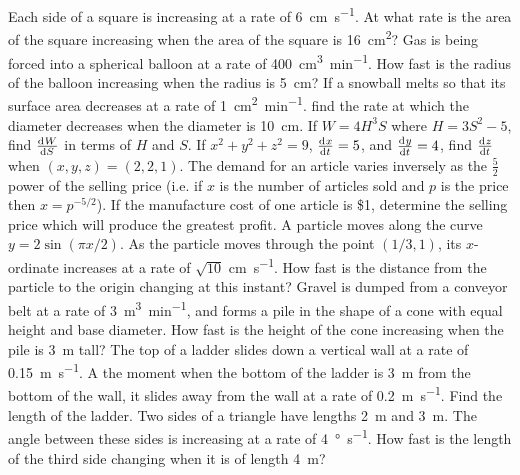 \begin{questions}
  \questioM Each side of a square is increasing at a rate of \SI{6}{\centi\metre\per\second}. At what rate is the
            area of the square increasing when the area of the square is \SI{16}{\centi\metre\squared}?
  \questioM Gas is being forced into a spherical balloon at a rate of \SI{400}{\centi\metre\cubed\per\minute}. How fast
            is the radius of the balloon increasing when the radius is \SI{5}{\centi\metre}?
  \questioM If a snowball melts so that its surface area decreases at a rate of \SI{1}{\centi\metre\squared\per\minute}.
            find the rate at which the diameter decreases when the diameter is \SI{10}{\centi\metre}.
  \questioM If $ W = 4H^3 S $ where $ H = 3S^2 - 5 $, find $ \od{W}{S} $ in terms of $ H $ and $ S $.
  \questioM If $ x^2 + y^2 + z^2 = 9 $, $ \od{x}{t} = 5 $, and $ \od{y}{t} = 4 $, find $ \od{z}{t} $ when $ (x,y,z) = (2,2,1) $.
  \questioE The demand for an article varies inversely as the $ \frac{5}{2} $ power of the selling price (i.e. if $ x $ is
            the number of articles sold and $ p $ is the price then $ x = p^{-5/2} $). If the manufacture cost of one
            article is \$1, determine the selling price which will produce the greatest profit.
  \questioE A particle moves along the curve $ y = 2\sin(\pi x/2) $. As the particle moves through the point $ (1/3, 1) $,
            its $ x$-ordinate increases at a rate of $ \sqrt{10} $ \si{\centi\metre\per\second}. How fast is the distance
            from the particle to the origin changing at this instant?
  \questioM Gravel is dumped from a conveyor belt at a rate of \SI{3}{\metre\cubed\per\minute}, and forms a pile in the shape
            of a cone with equal height and base diameter. How fast is the height of the cone increasing when the pile is \SI{3}{\metre}
            tall?
  \questioM The top of a ladder slides down a vertical wall at a rate of \SI{0.15}{\metre\per\second}. A the moment when the bottom
            of the ladder is \SI{3}{\metre} from the bottom of the wall, it slides away from the wall at a rate of \SI{0.2}{\metre\per\second}.
            Find the length of the ladder.
  \questioM Two sides of a triangle have lengths \SI{2}{\metre} and \SI{3}{\metre}. The angle between these sides is increasing
            at a rate of \SI{4}{\degree\per\second}. How fast is the length of the third side changing when it is of length \SI{4}{\metre}?

\end{questions}

